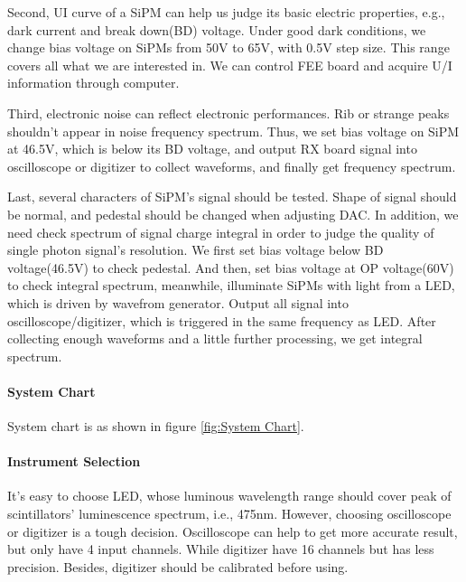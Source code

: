 \documentclass[11pt,a4paper]{article}
\begin{document}
Second, UI curve of a SiPM can help us judge its basic electric properties, e.g., dark current and break down(BD) voltage.
Under good dark conditions, we change bias voltage on SiPMs from 50V to 65V, with 0.5V step size. This range covers all what we are interested in.
We can control FEE board and acquire U/I information through computer.

Third, electronic noise can reflect electronic performances. Rib or strange peaks shouldn't appear in noise frequency spectrum. Thus, we set bias voltage on
SiPM at 46.5V, which is below its BD voltage, and output RX board signal into oscilloscope or digitizer to collect waveforms, and finally get frequency spectrum.

Last, several characters of SiPM's signal should be tested. Shape of signal should be normal, and pedestal should be changed when adjusting DAC. In addition, we need check
spectrum of signal charge integral in order to judge the quality of single photon signal's resolution. We first set bias voltage below BD voltage(46.5V) to check pedestal. And
then, set bias voltage at OP voltage(60V) to check integral spectrum, meanwhile, illuminate SiPMs with light from a LED, which is driven by wavefrom generator. Output all signal
into oscilloscope/digitizer, which is triggered in the same frequency as LED. After collecting enough waveforms and a little further processing, we get integral spectrum.

\paragraph{System Chart}
System chart is as shown in figure \ref{fig:System Chart}.

\paragraph{Instrument Selection}It's easy to choose LED, whose luminous wavelength range should cover peak of scintillators' luminescence spectrum, i.e., 475nm.
However, choosing oscilloscope or digitizer is a tough decision. Oscilloscope can help to get more accurate result, but only have 4 input channels. While digitizer have
16 channels but has less precision. Besides, digitizer should be calibrated before using.
\end{document}
